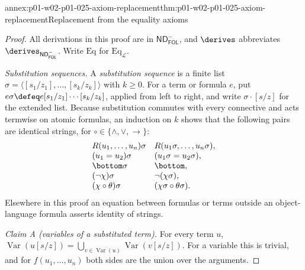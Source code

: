 \begin{annexitem}{annex:p01-w02-p01-025-axiom-replacement}{thm:p01-w02-p01-025-axiom-replacement}{Replacement from the equality axioms}
\begin{proof}
All derivations in this proof are in \(\mathsf{ND}^{-}_{\mathsf{FOL}}\), and
\(\derives\) abbreviates \(\derives_{\mathsf{ND}^{-}_{\mathsf{FOL}}}\).
Write \(\mathrm{Eq}\) for \(\mathrm{Eq}_{\mathcal L}\).

\emph{Substitution sequences.}  A \emph{substitution sequence} is a finite
list \(\sigma=\langle[s_1/z_1],\ldots,[s_k/z_k]\rangle\) with \(k\geq 0\).
For a term or formula \(e\), put
\(e\sigma\defeq e[s_1/z_1]\cdots[s_k/z_k]\), applied from left to right, and
write \(\sigma\cdot[s/z]\) for the extended list.  Because substitution
commutes with every connective and acts termwise on atomic formulas, an
induction on \(k\) shows that the following pairs are identical strings, for
\(\circ\in\{\land,\lor,\to\}\):
\[
\begin{array}{ll}
 R(u_1,\ldots,u_n)\sigma & R(u_1\sigma,\ldots,u_n\sigma),\\
 (u_1=u_2)\sigma & (u_1\sigma=u_2\sigma),\\
 \bottom\sigma & \bottom,\\
 (\neg\chi)\sigma & \neg(\chi\sigma),\\
 (\chi\circ\theta)\sigma & (\chi\sigma\circ\theta\sigma).
\end{array}
\]
Elsewhere in this proof an equation between formulas or terms outside an
object-language formula asserts identity of strings.

\emph{Claim A (variables of a substituted term).}  For every term \(u\),
\(\operatorname{Var}(u[s/z])=\bigcup_{v\in\operatorname{Var}(u)}
\operatorname{Var}(v[s/z])\).  For a variable this is trivial, and for
\(f(u_1,\ldots,u_n)\) both sides are the union over the arguments.


\end{proof}
\end{annexitem}
